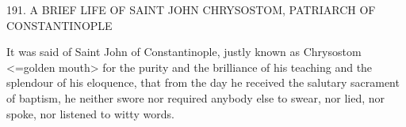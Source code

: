 191. A BRIEF LIFE OF SAINT JOHN CHRYSOSTOM,
PATRIARCH OF CONSTANTINOPLE

It was said of Saint John of Constantinople, justly known as
Chrysostom <=golden mouth> for the purity and the brilliance of
his teaching and the splendour of his eloquence, that from the day
he received the salutary sacrament of baptism, he neither swore nor
required anybody else to swear, nor lied, nor spoke, nor listened to
witty words.
